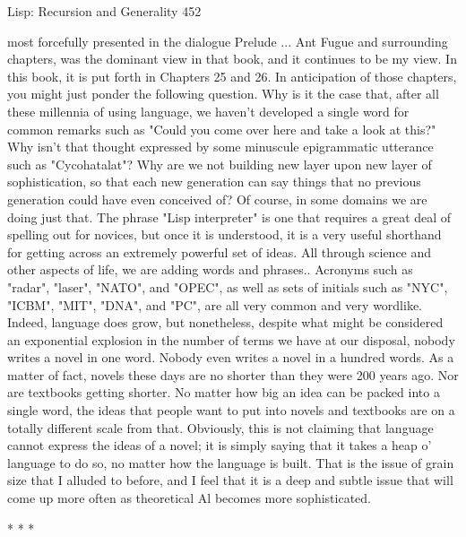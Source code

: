 Lisp: Recursion and Generality                                                         452

most forcefully presented in the dialogue Prelude ... Ant Fugue and surrounding
chapters, was the dominant view in that book, and it continues to be my view. In this
book, it is put forth in Chapters 25 and 26.
        In anticipation of those chapters, you might just ponder the following question.
Why is it the case that, after all these millennia of using language, we haven't
developed a single word for common remarks such as "Could you come over here and
take a look at this?" Why isn't that thought expressed by some minuscule
epigrammatic utterance such as "Cycohatalat"? Why are we not building new layer
upon new layer of sophistication, so that each new generation can say things that no
previous generation could have even conceived of? Of course, in some domains we
are doing just that. The phrase "Lisp interpreter" is one that requires a great deal of
spelling out for novices, but once it is understood, it is a very useful shorthand for
getting across an extremely powerful set of ideas. All through science and other
aspects of life, we are adding words and phrases.. Acronyms such as "radar", "laser",
"NATO", and "OPEC", as well as sets of initials such as "NYC", "ICBM", "MIT",
"DNA", and "PC", are all very common and very wordlike.
        Indeed, language does grow, but nonetheless, despite what might be
considered an exponential explosion in the number of terms we have at our disposal,
nobody writes a novel in one word. Nobody even writes a novel in a hundred words.
As a matter of fact, novels these days are no shorter than they were 200 years ago.
Nor are textbooks getting shorter. No matter how big an idea can be packed into a
single word, the ideas that people want to put into novels and textbooks are on a
totally different scale from that. Obviously, this is not claiming that language cannot
express the ideas of a novel; it is simply saying that it takes a heap o' language to do
so, no matter how the language is built. That is the issue of grain size that I alluded to
before, and I feel that it is a deep and subtle issue that will come up more often as
theoretical Al becomes more sophisticated.

                                        *       *      *

